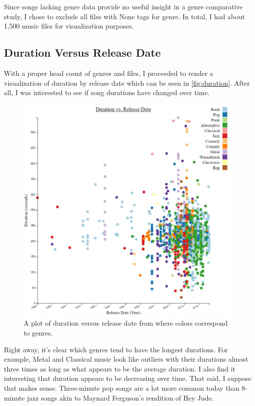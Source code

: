\documentclass[journal]{vgtc}                %
\begin{document}
Since songs lacking genre data provide no useful insight in a genre comparative
study, I chose to exclude all files with None tags for genre. In total, I had
about 1,500 music files for visualization purposes.

\subsection{Duration Versus Release Date}

With a proper head count of genres and files, I proceeded to render a
visualization of duration by release date which can be seen in
\autoref{fig:duration}. After all, I was interested to see if song durations
have changed over time.

\begin{figure}[h]
 \centering %
 \includegraphics[width=\columnwidth]{duration-vs-release-date}
 \caption{A plot of duration versus release date from \cite{Grifski:2019:Duration} where colors correspond to genres.}
 \label{fig:duration}
\end{figure}

Right away, it's clear which genres tend to have the longest durations. For
example, Metal and Classical music look like outliers with their durations
almost three times as long as what appears to be the average duration. I also
find it interesting that duration appears to be decreasing over time.
That said, I suppose that makes sense. Three-minute pop songs are a lot more
common today than 8-minute jazz songs akin to Maynard Ferguson's rendition
of Hey Jude.
\end{document}
